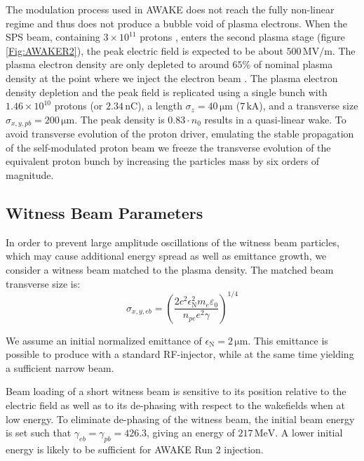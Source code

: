 \documentclass[aps,prstab,reprint,amsmath,amssymb,groupedaddress]{revtex4-1}
\newcommand{\unit}[1]{\,\mathrm{#1}}
\newcommand{\funit}[2]{\,\mathrm{#1}/\mathrm{#2}}
\newcommand{\nexp}[1]{\times 10^{#1}}
\begin{document}
The modulation process used in AWAKE does not reach the fully non-linear regime and thus does not produce a bubble void
of plasma electrons. When the SPS beam, containing $3\nexp{11}$ protons \cite{gschwendtner:2016}, enters the second
plasma stage (figure \ref{Fig:AWAKER2}), the peak electric field is expected to be about $500\funit{MV}{m}$. The plasma
electron density are only depleted to around $65\%$ of nominal plasma density at the point where we inject the electron
beam \cite{awake_collaboration:2016}.  The plasma electron density depletion and the peak field is replicated using a
single bunch with $1.46\nexp{10}$ protons (or $2.34\unit{nC}$), a length $\sigma_{z} = 40\unit{\mu m}$ ($7\unit{kA}$),
and a transverse size $\sigma_{x,y,pb} = 200\unit{\mu m}$. The peak density is $0.83\cdot n_{0}$ results in a
quasi-linear wake. To avoid transverse evolution of the proton driver, emulating the stable propagation of the
self-modulated proton beam \cite{lotov:2011, lotov:2015, caldwell:2011} we freeze the transverse evolution of the
equivalent proton bunch by increasing the particles mass by six orders of magnitude.

\subsection{Witness Beam Parameters}\label{S:M:Setup}

In order to prevent large amplitude oscillations of the witness beam particles, which may cause additional energy spread
as well as emittance growth, we consider a witness beam matched to the plasma density. The matched beam transverse size
is:
\begin{equation}
    \sigma_{x,y,eb}=\left(\frac{2c^{2}\epsilon_{\mathrm{N}}^{2}m_{e}\varepsilon_{0}}{n_{pe}e^{2}\gamma}\right)^{1/4}
    \label{EQ:Matched}
\end{equation}

We assume an initial normalized emittance of $\epsilon_{\mathrm{N}} = 2\unit{\mu m}$. This emittance is possible to
produce with a standard RF-injector, while at the same time yielding a sufficient narrow beam.

Beam loading of a short witness beam is sensitive to its position relative to the electric field \cite{tzoufras:2009}
as well as to its de-phasing with respect to the wakefields when at low energy. To eliminate de-phasing of the witness
beam, the initial beam energy is set such that $\gamma_{eb} = \gamma_{pb} = 426.3$, giving an energy of $217\unit{MeV}$.
A lower initial energy is likely to be sufficient for AWAKE Run 2 injection.
\end{document}
